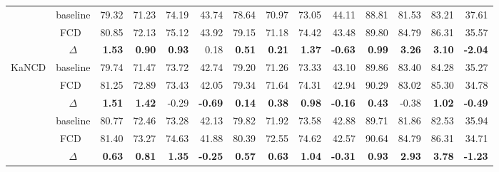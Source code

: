 \documentclass[runningheads]{llncs}
\def\mymethod{FCD}
\newcommand{\redbf}[1]{\textcolor{myred}{\textbf{#1}}} %
\newcommand{\green}[1]{\textcolor{mygreen}{#1}}       %
\begin{document}
\begin{table}[!htpb]
{\begin{tabular}{cc|rrrr|rrrr|rrrr}
\rowcolor{mybgc}& baseline & 79.32 & 71.23 & 74.19 & 43.74 & 78.64 & 70.97 & 73.05 & 44.11 & 88.81 & 81.53 & 83.21 & 37.61 \\
\rowcolor{mybgc} & \mymethod\ & 80.85 & 72.13 & 75.12 & 43.92 & 79.15 & 71.18 & 74.42 & 43.48 & 89.80 & 84.79 & 86.31 & 35.57 \\
\rowcolor{mybgc} \multirow{-3}{*}{NCDM} & $\Delta$ & \redbf{1.53} & \redbf{0.90} & \redbf{0.93} & \green{0.18} & \redbf{0.51} & \redbf{0.21} & \redbf{1.37} & \redbf{-0.63} & \redbf{0.99} & \redbf{3.26} & \redbf{3.10} & \redbf{-2.04}  \\

\multirow{3}{*}{KaNCD} & baseline & 79.74 & 71.47 & 73.72 & 42.74 & 79.20 & 71.26 & 73.33 & 43.10 & 89.86 & 83.40 & 84.28 & 35.27 \\
 & \mymethod\ & 81.25 & 72.89 & 73.43 & 42.05 & 79.34 & 71.64 & 74.31 & 42.94 & 90.29 & 83.02 & 85.30 & 34.78 \\
 & $\Delta$ & \redbf{1.51} & \redbf{1.42} & \green{-0.29} & \redbf{-0.69} & \redbf{0.14} & \redbf{0.38} & \redbf{0.98} & \redbf{-0.16} & \redbf{0.43} & \green{-0.38} & \redbf{1.02} & \redbf{-0.49}  \\

\rowcolor{mybgc}& baseline & 80.77 & 72.46 & 73.28 & 42.13 & 79.82 & 71.92 & 73.58 & 42.88 & 89.71 & 81.86 & 82.53 & 35.94 \\
\rowcolor{mybgc} & \mymethod\ & 81.40 & 73.27 & 74.63 & 41.88 & 80.39 & 72.55 & 74.62 & 42.57 & 90.64 & 84.79 & 86.31 & 34.71 \\
\rowcolor{mybgc} \multirow{-3}{*}{CDND} & $\Delta$ & \redbf{0.63} & \redbf{0.81} & \redbf{1.35} & \redbf{-0.25} & \redbf{0.57} & \redbf{0.63} & \redbf{1.04} & \redbf{-0.31} & \redbf{0.93} & \redbf{2.93} & \redbf{3.78} & \redbf{-1.23} \\
\bottomrule
\end{tabular}
}
\end{table}
\end{document}

